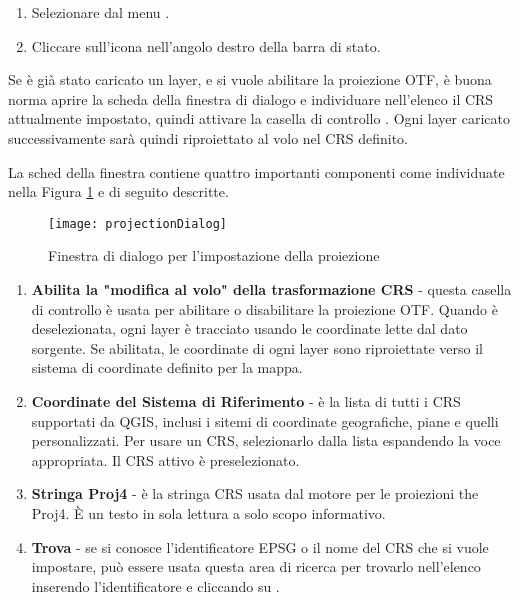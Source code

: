 \begin{enumerate}
\item Selezionare  dal menu
.
\item Cliccare sull'icona 
nell'angolo destro della barra di stato.
\end{enumerate}

Se è già stato caricato un layer, e si vuole abilitare la proiezione OTF, è
buona norma aprire la scheda  della finestra di dialogo  e
individuare nell'elenco il CRS attualmente impostato, quindi attivare
la casella di controllo . Ogni layer caricato successivamente sarà quindi
riproiettato al volo nel CRS definito.

La sched  della finestra 
contiene quattro importanti componenti come individuate nella Figura \ref{fig:projections}
e di seguito descritte.

\begin{figure}[ht]
   \begin{center}
   \caption{Finestra di dialogo per l'impostazione della proiezione \nixcaption}\label{fig:projections}\smallskip
   \texttt{[image: projectionDialog]}
\end{center}  
\end{figure}

\begin{enumerate}
\item \textbf{Abilita la "modifica al volo" della trasformazione CRS} -
questa casella di controllo è usata per abilitare o disabilitare la proiezione
OTF. Quando è deselezionata, ogni layer è tracciato usando le coordinate lette
dal dato sorgente. Se abilitata, le coordinate di ogni layer sono riproiettate
verso il sistema di coordinate definito per la mappa.
\item \textbf{Coordinate del Sistema di Riferimento} - è la lista di tutti i CRS
supportati da QGIS, inclusi i sitemi di coordinate geografiche, piane e
quelli personalizzati. Per usare un CRS, selezionarlo dalla lista espandendo
la voce appropriata. Il CRS attivo è preselezionato.
\item \textbf{Stringa Proj4} - è la stringa CRS usata dal motore per le
proiezioni the Proj4. È un testo in sola lettura a solo scopo informativo.
\item \textbf{Trova} - se si conosce l'identificatore EPSG o il nome del CRS
che si vuole impostare, può essere usata questa area di ricerca per trovarlo
nell'elenco inserendo l'identificatore e cliccando su .
\end{enumerate}

